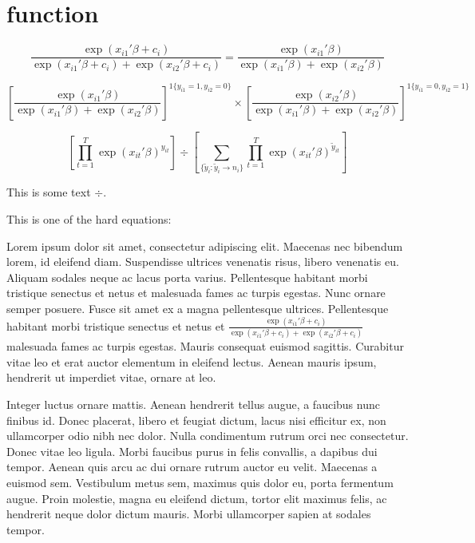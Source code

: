 \section{function}
\label{sec:function}

\begin{equation}
  \frac{\exp(x_{i1}{'}\beta + c_{i})}
       {\exp(x_{i1}{'}\beta + c_{i}) + \exp(x_{i2}{'}\beta + c_{i})} =
  \frac{\exp(x_{i1}{'}\beta)}
       {\exp(x_{i1}{'}\beta) + \exp(x_{i2}{'}\beta)}
\end{equation}

\begin{equation*}
  \left[\frac{\exp(x_{i1}'\beta)}
              {\exp(x_{i1}'\beta) + \exp(x_{i2}'\beta)}
   \right]^{1\{y_{i1} = 1, y_{i2} = 0\}} \times
  \left[\frac{\exp(x_{i2}'\beta)}
             {\exp(x_{i1}'\beta) + \exp(x_{i2}'\beta)}
  \right]^{1\{y_{i1} = 0, y_{i2} = 1\}}
\end{equation*}

\begin{equation}
  \left[\displaystyle\prod_{t=1}^{T} \exp(x_{it}{'}\beta)^{y_{it}}\right] \div
  \left[\displaystyle\sum_{\{\tilde{y}_{i} {:} \tilde{y}_{i} \to n_{i}\}}
     \displaystyle\prod_{t=1}^{T} \exp(x_{it}{'}\beta)^{\tilde{y}_{it}} \right]
\end{equation}

This is some text $\div$.

This is one of the hard equations:

Lorem ipsum dolor sit amet, consectetur adipiscing elit.
Maecenas nec bibendum lorem, id eleifend diam.
Suspendisse ultrices venenatis risus,   libero venenatis eu.
Aliquam sodales neque ac lacus porta varius.
Pellentesque habitant morbi tristique senectus et netus et malesuada fames ac
turpis egestas. Nunc ornare semper posuere. Fusce sit amet ex a magna
pellentesque ultrices. Pellentesque habitant morbi tristique senectus et netus
et ${\frac{\exp(x_{i1}{'}\beta + c_{i})}
     {\exp(x_{i1}{'}\beta + c_{i}) + \exp(x_{i2}{'}\beta + c_{i})}}$ malesuada fames ac turpis egestas. Mauris consequat euismod sagittis.
Curabitur vitae leo et erat auctor elementum in eleifend lectus. Aenean mauris
ipsum, hendrerit ut imperdiet vitae, ornare at leo.

Integer luctus ornare mattis. Aenean hendrerit tellus augue, a faucibus nunc finibus id. Donec placerat, libero et feugiat dictum, lacus nisi efficitur ex, non ullamcorper odio nibh nec dolor. Nulla condimentum rutrum orci nec consectetur. Donec vitae leo ligula. Morbi faucibus purus in felis convallis, a dapibus dui tempor. Aenean quis arcu ac dui ornare rutrum auctor eu velit. Maecenas a euismod sem. Vestibulum metus sem, maximus quis dolor eu, porta fermentum augue. Proin molestie, magna eu eleifend dictum, tortor elit maximus felis, ac hendrerit neque dolor dictum mauris. Morbi ullamcorper sapien at sodales tempor.

